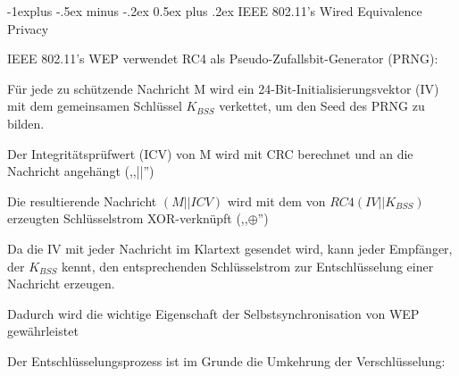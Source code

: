\documentclass[a4paper]{article}
\makeatletter
\renewcommand{\subsection}{\@startsection{subsection}{2}{0mm}%
 {-1explus -.5ex minus -.2ex}%
 {0.5ex plus .2ex}%
 {\normalfont\normalsize\bfseries}}
\makeatother
\begin{document}
\begin{multicols}{3}
      \subsection{IEEE 802.11's Wired Equivalence Privacy}
      \begin{itemize*}
            \item IEEE 802.11's WEP verwendet RC4 als Pseudo-Zufallsbit-Generator (PRNG):
            \begin{itemize*}
                  \item Für jede zu schützende Nachricht M wird ein 24-Bit-Initialisierungsvektor (IV) mit dem gemeinsamen Schlüssel $K_{BSS}$ verkettet, um den Seed des PRNG zu bilden.
                  \item Der Integritätsprüfwert (ICV) von M wird mit CRC berechnet und an die Nachricht angehängt (,,||'')
                  \item Die resultierende Nachricht $(M || ICV)$ wird mit dem von $RC4(IV || K_{BSS})$ erzeugten Schlüsselstrom XOR-verknüpft (,,$\oplus$'')
            \end{itemize*}
            \item Da die IV mit jeder Nachricht im Klartext gesendet wird, kann jeder Empfänger, der $K_{BSS}$ kennt, den entsprechenden Schlüsselstrom zur Entschlüsselung einer Nachricht erzeugen.
            \begin{itemize*}
                  \item Dadurch wird die wichtige Eigenschaft der Selbstsynchronisation von WEP gewährleistet
                  \item Der Entschlüsselungsprozess ist im Grunde die Umkehrung der Verschlüsselung:
            \end{itemize*}
      \end{itemize*}


\end{multicols}
\end{document}
